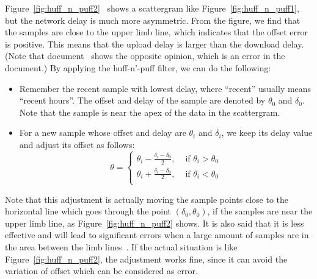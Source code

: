 Figure~\ref{fig:huff_n_puff2}~\cite{huff_n_puff} shows a scattergram like
Figure~\ref{fig:huff_n_puff1}, but the network delay is much more asymmetric.
From the figure, we find that the samples are close to the upper limb line,
which indicates that the offset error is positive. This means that the upload
delay is larger than the download delay. (Note that document~\cite{huff_n_puff}
shows the opposite opinion, which is an error in the
document.) By applying the huff-n'-puff filter, we can do the following:
\begin{itemize}
    \item 
        Remember the recent sample with lowest delay, where ``recent'' usually
        means ``recent hours''. The offset and delay of the sample are denoted
        by $\theta_0$ and $\delta_0$. Note that the sample is near the apex of
        the data in the scattergram.
    \item 
        For a new sample whose offset and delay are $\theta_i$ and
        $\delta_i$, we keep its delay value and adjust its offset as follows:
        \begin{equation}
            \theta = 
            \begin{cases}
                \displaystyle
                \theta_i - \frac{\delta_i - \delta_0}{2}, &\text{ if }\theta_i
                > \theta_0\\
                \displaystyle
                \theta_i + \frac{\delta_i - \delta_0}{2}, &\text{ if }\theta_i
                < \theta_0\\
            \end{cases}
            \label{eq:huff_n_puff}
        \end{equation}
\end{itemize}



Note that this adjustment is actually moving the sample points close to the
horizontal line which goes through the point $(\delta_0, \theta_0)$, if the
samples are near the upper limb line, as Figure~\ref{fig:huff_n_puff2} shows.
It is also said that it is less effective and will lead to significant errors
when a large amount of samples are in the area between the limb
lines~\cite{huff_n_puff}. If the actual situation is like
Figure~\ref{fig:huff_n_puff2}, the adjustment works fine, since it can avoid
the variation of offset which can be considered as error.


